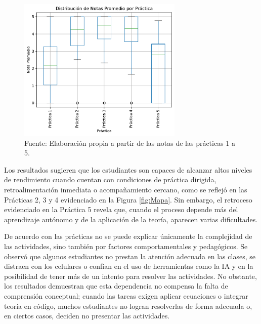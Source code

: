 \documentclass[letter,oneside,12pt,spanish]{report}
\begin{document}
\begin{figure}[ht]
	\centering
	\includegraphics[width=0.7\textwidth]{Figs/Promedio_Notas.pdf}
	\label{fig:Promedio}
	\\Fuente: Elaboración propia a partir de las notas de las prácticas 1 a 5.
\end{figure}

\newpage

Los resultados sugieren que los estudiantes son capaces de alcanzar altos niveles de rendimiento cuando cuentan con condiciones de práctica dirigida, retroalimentación inmediata o acompañamiento cercano, como se reflejó en las Prácticas 2, 3 y 4 evidenciado en la Figura \ref{fig:Mapa}. Sin embargo, el retroceso evidenciado en la Práctica 5 revela que, cuando el proceso depende más del aprendizaje autónomo y de la aplicación de la teoría, aparecen varias dificultades.

De acuerdo con las prácticas no se puede explicar únicamente la complejidad de las actividades, sino también por factores comportamentales y pedagógicos. Se observó que algunos estudiantes no prestan la atención adecuada en las clases, se distraen con los celulares o confían en el uso de herramientas como la IA y en la posibilidad de tener más de un intento para resolver las actividades. No obstante, los resultados demuestran que esta dependencia no compensa la falta de comprensión conceptual; cuando las tareas exigen aplicar ecuaciones o integrar teoría en código, muchos estudiantes no logran resolverlas de forma adecuada o, en ciertos casos, deciden no presentar las actividades.
\end{document}
